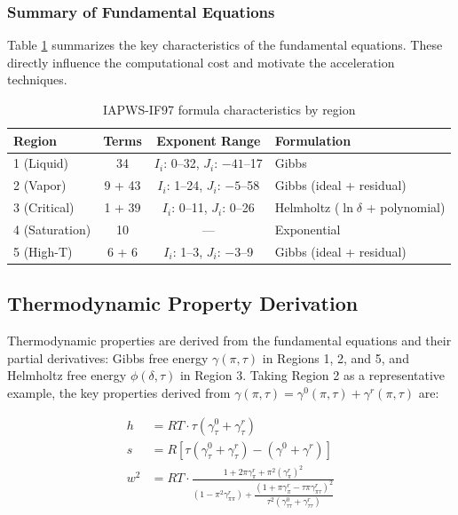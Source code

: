 \documentclass{article}
\begin{document}
\subsubsection{Summary of Fundamental Equations}

Table \ref{tab:formula_char} summarizes the key characteristics of the fundamental equations. These directly influence the computational cost and motivate the acceleration techniques.

\begin{table}[H]
\centering
\caption{IAPWS-IF97 formula characteristics by region}
\label{tab:formula_char}
\begin{tabular}{lccl}
\toprule
\textbf{Region} & \textbf{Terms} & \textbf{Exponent Range} & \textbf{Formulation} \\
\midrule
1 (Liquid) & 34 & $I_i$: 0--32, $J_i$: $-41$--17 & Gibbs \\
2 (Vapor) & 9 + 43 & $I_i$: 1--24, $J_i$: $-5$--58 & Gibbs (ideal + residual) \\
3 (Critical) & 1 + 39 & $I_i$: 0--11, $J_i$: 0--26 & Helmholtz ($\ln\delta$ + polynomial) \\
4 (Saturation) & 10 & --- & Exponential \\
5 (High-T) & 6 + 6 & $I_i$: 1--3, $J_i$: $-3$--9 & Gibbs (ideal + residual) \\
\bottomrule
\end{tabular}
\end{table}

\subsection{Thermodynamic Property Derivation}
\label{sec:thermodynamic_property_derivation}

Thermodynamic properties are derived from the fundamental equations and their partial derivatives: Gibbs free energy $\gamma(\pi,\tau)$ in Regions 1, 2, and 5, and Helmholtz free energy $\phi(\delta,\tau)$ in Region 3. Taking Region 2 as a representative example, the key properties derived from $\gamma(\pi,\tau) = \gamma^0(\pi,\tau) + \gamma^r(\pi,\tau)$ are:

\begin{align}
h &= RT \cdot \tau \left( \gamma^0_\tau + \gamma^r_\tau \right) \label{eq:enthalpy} \\
s &= R \left[ \tau \left( \gamma^0_\tau + \gamma^r_\tau \right) - \left( \gamma^0 + \gamma^r \right) \right] \label{eq:entropy} \\
w^2 &= RT \cdot \frac{1 + 2\pi\gamma^r_\pi + \pi^2(\gamma^r_\pi)^2}{\left( 1 - \pi^2\gamma^r_{\pi\pi} \right) + \dfrac{\left( 1 + \pi\gamma^r_\pi - \tau\pi\gamma^r_{\pi\tau} \right)^2}{\tau^2\left( \gamma^0_{\tau\tau} + \gamma^r_{\tau\tau} \right)}} \label{eq:speed}
\end{align}
\end{document}

